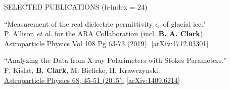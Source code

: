 \documentclass{resume} %
\begin{document}
\begin{rSection}{SELECTED PUBLICATIONS (h-index = 24)}
\begin{etaremune}
  \item ``Measurement of the real dielectric permittivity $\epsilon_r$ of glacial ice." \\
 P. Allison {\it et al.} for the ARA Collaboration (incl. \textbf{B. A. Clark}) \\
 \href{https://doi.org/10.1016/j.astropartphys.2019.01.004}{Astroparticle Physics Vol 108 Pg 63-73 (2019).} \href{https://arxiv.org/abs/1712.03301}{[arXiv:1712.03301]} 

   \item ``Analyzing the Data from X-ray Polarimeters with Stokes Parameters." \\
 F. Kislat,  \textbf{B. Clark}, M. Bielicke, H. Krawczynski.  \\
  \href{http://dx.doi.org/10.1016/j.astropartphys.2015.02.007}{Astroparticle Physics 68, 45-51 (2015).} \href{https://arxiv.org/abs/1409.6214}{[arXiv:1409.6214]} 
  


 \end{etaremune}
 
\end{rSection}

\newpage
\end{document}
